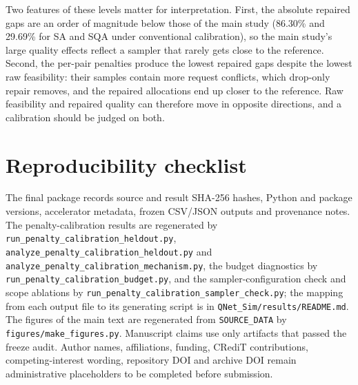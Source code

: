 \documentclass[pdflatex,sn-nature]{sn-jnl}
\begin{document}
Two features of these levels matter for interpretation. First, the absolute repaired gaps are an order of magnitude below those of the main study (86.30\% and 29.69\% for SA and SQA under conventional calibration), so the main study's large quality effects reflect a sampler that rarely gets close to the reference. Second, the per-pair penalties produce the lowest repaired gaps despite the lowest raw feasibility: their samples contain more request conflicts, which drop-only repair removes, and the repaired allocations end up closer to the reference. Raw feasibility and repaired quality can therefore move in opposite directions, and a calibration should be judged on both.

\section{Reproducibility checklist}
The final package records source and result SHA-256 hashes, Python and package versions, accelerator metadata, frozen CSV/JSON outputs and provenance notes. The penalty-calibration results are regenerated by \texttt{run\_penalty\_calibration\_heldout.py}, \texttt{analyze\_penalty\_calibration\_heldout.py} and \texttt{analyze\_penalty\_calibration\_mechanism.py}, the budget diagnostics by \texttt{run\_penalty\_calibration\_budget.py}, and the sampler-configuration check and scope ablations by \texttt{run\_penalty\_calibration\_sampler\_check.py}; the mapping from each output file to its generating script is in \texttt{QNet\_Sim/results/README.md}. The figures of the main text are regenerated from \texttt{SOURCE\_DATA} by \texttt{figures/make\_figures.py}. Manuscript claims use only artifacts that passed the freeze audit. Author names, affiliations, funding, CRediT contributions, competing-interest wording, repository DOI and archive DOI remain administrative placeholders to be completed before submission.
\end{document}
